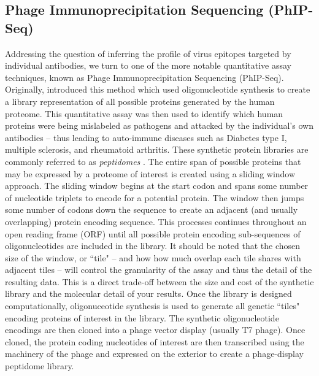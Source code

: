 \documentclass{article}
\begin{document}
\subsection*{Phage Immunoprecipitation Sequencing (PhIP-Seq)}
Addressing the question of inferring the profile of virus epitopes targeted by individual antibodies, we turn to one of the more notable quantitative assay techniques, known as Phage Immunoprecipitation Sequencing (PhIP-Seq).
Originally, \citet{Larman2011} introduced this method which used oligonucleotide synthesis to create a library representation of all possible proteins generated by the human proteome.
This quantitative assay was then used to identify which human proteins were being mislabeled as pathogens and attacked by the individual's own antibodies -- thus leading to auto-immune diseases such as Diabetes type I, multiple sclerosis, and rheumatoid arthritis.
These synthetic protein libraries are commonly referred to as \textit{peptidomes} \citep{Mohan2018}.
The entire span of possible proteins that may be expressed by a proteome of interest is created using a sliding window approach.
The sliding window begins at the start codon and spans some number of nucleotide triplets to encode for a potential protein.
The window then jumps some number of codons down the sequence to create an adjacent (and usually overlapping) protein encoding sequence.
This processes continues throughout an open reading frame (ORF) until all possible protein encoding sub-sequences of oligonucleotides are included in the library.
It should be noted that the chosen size of the window, or ``tile" -- and how how much overlap each tile shares with adjacent tiles -- will control the granularity of the assay and thus the detail of the resulting data.
This is a direct trade-off between the size and cost of the synthetic library and the molecular detail of your results.
Once the library is designed computationally, oligonuceotide synthesis is used to generate all genetic ``tiles"  encoding proteins of interest in the library.
The synthetic oligonucleotide encodings are then cloned into a phage vector display (usually T7 phage). 
Once cloned, the protein coding nucleotides of interest are then transcribed using the machinery of the phage and expressed on the exterior to create a phage-display peptidome library.
\end{document}
